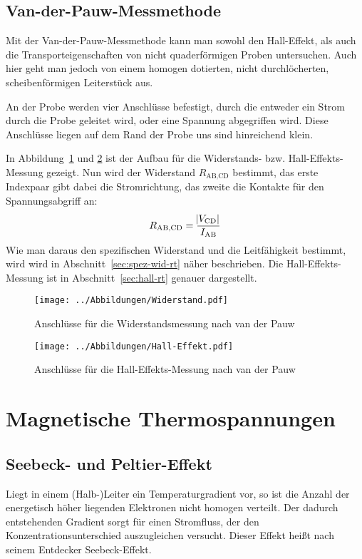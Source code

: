 \subsection{Van-der-Pauw-Messmethode}

Mit der Van-der-Pauw-Messmethode kann man sowohl den Hall-Effekt, als auch die
Transporteigenschaften von nicht quaderförmigen Proben untersuchen. Auch hier
geht man jedoch von einem homogen dotierten, nicht durchlöcherten,
scheibenförmigen Leiterstück aus.

An der Probe werden vier Anschlüsse befestigt, durch die entweder ein Strom
durch die Probe geleitet wird, oder eine Spannung abgegriffen wird. Diese
Anschlüsse liegen auf dem Rand der Probe uns sind hinreichend klein.

In Abbildung~\ref{fig:vdPauw-wid} und \ref{fig:vdPauw-hall} ist der Aufbau für
die Widerstands- bzw. Hall-Effekts-Messung gezeigt. Nun wird der Widerstand
$R_\text{AB,CD}$ bestimmt, das erste Indexpaar gibt dabei die Stromrichtung,
das zweite die Kontakte für den Spannungsabgriff an:
\[
    R_\text{AB,CD} = \frac{\abs{V_\text{CD}}}{I_\text{AB}}
\]
Wie man daraus den spezifischen Widerstand und die Leitfähigkeit bestimmt, wird
wird in Abschnitt~\ref{sec:spez-wid-rt} näher beschrieben. Die
Hall-Effekts-Messung ist in Abschnitt~\ref{sec:hall-rt} genauer dargestellt.

\begin{figure}
    \centering
    \texttt{[image: ../Abbildungen/Widerstand.pdf]}
    \caption{%
        Anschlüsse für die Widerstandsmessung nach van der Pauw
    }
    \label{fig:vdPauw-wid}
\end{figure}

\begin{figure}
    \centering
    \texttt{[image: ../Abbildungen/Hall-Effekt.pdf]}
    \caption{%
        Anschlüsse für die Hall-Effekts-Messung nach van der Pauw
    }
    \label{fig:vdPauw-hall}
\end{figure}

\section{Magnetische Thermospannungen}

\subsection{Seebeck- und Peltier-Effekt}

Liegt in einem (Halb-)Leiter ein Temperaturgradient vor, so ist die Anzahl der
energetisch höher liegenden Elektronen nicht homogen verteilt. Der dadurch
entstehenden Gradient sorgt für einen Stromfluss, der den
Konzentrationsunterschied auszugleichen versucht. Dieser Effekt heißt nach
seinem Entdecker Seebeck-Effekt.

